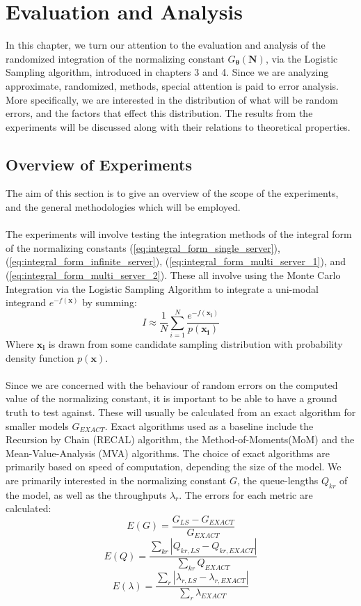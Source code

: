 \chapter{Evaluation and Analysis}\label{chap:EvalAnalysis} 

In this chapter, we turn our attention to the evaluation and analysis of the randomized integration of the normalizing constant \(G_{\boldsymbol{\theta}}(\mathbf{N})\), via the Logistic Sampling algorithm, introduced in chapters 3 and 4. Since we are analyzing approximate, randomized, methods, special attention is paid to error analysis. More specifically, we are interested in the distribution of what will be random errors, and the factors that effect this distribution. The results from the experiments will be discussed along with their relations to theoretical properties.

\section{Overview of Experiments}\label{sec:overview_experiments}
The aim of this section is to give an overview of the scope of the experiments, and the general methodologies which will be employed. 
\\\\
The experiments will involve testing the integration methods of the integral form of the normalizing constants (\ref{eq:integral_form_single_server}), (\ref{eq:integral_form_infinite_server}), (\ref{eq:integral_form_multi_server_1}), and (\ref{eq:integral_form_multi_server_2}). These all involve using the Monte Carlo Integration via the Logistic Sampling Algorithm to integrate a uni-modal integrand \(e^{-f(\mathbf{x})}\) by summing:
\[I \approx \frac{1}{N} \sum_{i=1}^N \frac{e^{-f(\mathbf{x_i})}}{p(\mathbf{x_i})}\]
Where \(\mathbf{x_i}\) is drawn from some candidate sampling distribution with probability density function \(p(\mathbf{x})\).
\\\\
Since we are concerned with the behaviour of random errors on the computed value of the normalizing constant, it is important to be able to have a ground truth to test against. These will usually be calculated from an exact algorithm for smaller models \(G_{EXACT}\). Exact algorithms used as a baseline include the Recursion by Chain (RECAL) algorithm, the Method-of-Moments(MoM) and the Mean-Value-Analysis (MVA) algorithms. The choice of exact algorithms are primarily based on speed of computation, depending the size of the model. We are primarily interested in the normalizing constant \(G\), the queue-lengths \(Q_{kr}\) of the model, as well as the throughputs \(\lambda_{r}\). The errors for each metric are calculated:
\[E(G) = \frac{G_{LS} - G_{EXACT}}{G_{EXACT}}\]
\[E(Q) = \frac{\sum_{kr} |Q_{kr,LS} - Q_{kr,EXACT}|}{\sum_{kr} Q_{EXACT}}\]
\[E(\lambda) = \frac{\sum_{r} |\lambda_{r,LS} - \lambda_{r,EXACT}|}{\sum_{r} \lambda_{EXACT}}\]

